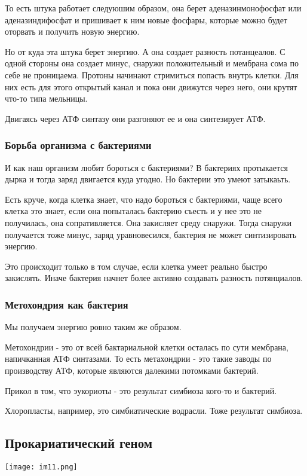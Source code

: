 То есть штука работает следуюшим образом, она берет аденазинмонофосфат или 
аденазиндифосфат и пришивает к ним новые фосфары, которые можно будет оторвать
и получить новую энергию.

Но от куда эта штука берет энергию. А она создает разность потанцеалов. С одной
стороны она создает минус, снаружи положительный и мембрана сома по себе не
проницаема. Протоны начинают стримиться попасть внутрь клетки. Для них есть
для этого открытый канал и пока они движутся через него, они крутят что-то типа мельницы.

Двигаясь через АТФ синтазу они разгоняют ее и она синтезирует АТФ.

\subsubsection{Борьба организма с бактериями}
И как наш организм любит бороться с бактериями? В бактериях протыкается
дырка и тогда заряд двигается куда угодно. Но бактерии это умеют затыкаьть.

Есть круче, когда клетка знает, что надо бороться с бактериями, чаще всего клетка это
знает, если она попыталась бактерию съесть и у нее это не получилась, она сопративляется.
Она закисляет среду снаружи. Тогда снаружи получается тоже минус, заряд
уравновесился, бактерия не может синтизировать энергию.

Это происходит только в том случае, если клетка умеет реально быстро закислять. Иначе бактерия
начнет более активно создавать разность потянциалов.

\subsubsection{Метохондрия как бактерия}
Мы получаем энергию ровно таким же образом.

Метохондрии - это от всей бактариальной клетки осталась по сути
мембрана, напичканная АТФ синтазами. То есть метахондрии -
это такие заводы по производству АТФ, которые являются далекими
потомками бактерий.

Прикол в том, что эукориоты - это результат
симбиоза кого-то и бактерий.

Хлоропласты, например, это симбиатические водрасли. Тоже
результат симбиоза.   

\subsection{Прокариатический геном}
\texttt{[image: im11.png]}

